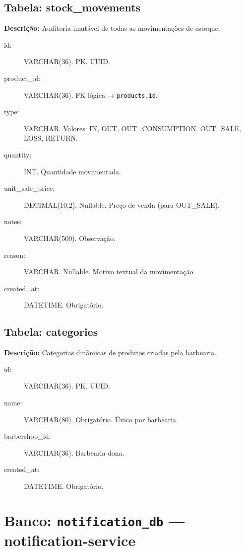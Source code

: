 \documentclass[
    12pt, 
    a4paper, 
    oneside, 
    chapter=TITLE, 
    section=TITLE
]{abntex2}
\begin{document}
\begin{apendicesenv}
\subsection*{Tabela: stock\_movements}
\textbf{Descrição:} Auditoria imutável de todas as movimentações de estoque.
\begin{description}
    \item[id:] VARCHAR(36). PK. UUID.
    \item[product\_id:] VARCHAR(36). FK lógica → \texttt{products.id}.
    \item[type:] VARCHAR. Valores: IN, OUT, OUT\_CONSUMPTION, OUT\_SALE, LOSS, RETURN.
    \item[quantity:] INT. Quantidade movimentada.
    \item[unit\_sale\_price:] DECIMAL(10,2). Nullable. Preço de venda (para OUT\_SALE).
    \item[notes:] VARCHAR(500). Observação.
    \item[reason:] VARCHAR. Nullable. Motivo textual da movimentação.
    \item[created\_at:] DATETIME. Obrigatório.
\end{description}

\subsection*{Tabela: categories}
\textbf{Descrição:} Categorias dinâmicas de produtos criadas pela barbearia.
\begin{description}
    \item[id:] VARCHAR(36). PK. UUID.
    \item[name:] VARCHAR(80). Obrigatório. Único por barbearia.
    \item[barbershop\_id:] VARCHAR(36). Barbearia dona.
    \item[created\_at:] DATETIME. Obrigatório.
\end{description}

\section*{Banco: \texttt{notification\_db} — notification-service}


\end{apendicesenv}
\end{document}
